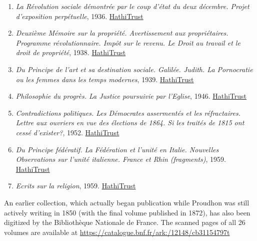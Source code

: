 \begin{enumerate}
    \item \textit{La Révolution sociale démontrée par le coup d'état du deux décembre. Projet d'exposition perpétuelle}, 1936. \href{https://hdl.handle.net/2027/uc1.b4149266}{HathiTrust}
    
    \item \textit{Deuxième Mémoire sur la propriété. Avertissement aux propriétaires. Programme révolutionnaire. Impôt sur le revenu. Le Droit au travail et le droit de propriété}, 1938. \href{https://hdl.handle.net/2027/uc1.b4149267}{HathiTrust}
    
    \item \textit{Du Principe de l'art et sa destination sociale. Galilée. Judith. La Pornocratie ou les femmes dans les temps modernes}, 1939. \href{https://hdl.handle.net/2027/uc1.b4149268}{HathiTrust}
    
    \item \textit{Philosophie du progrès. La Justice poursuivie par l'Eglise}, 1946. \href{https://hdl.handle.net/2027/uc1.b4149269}{HathiTrust}
    
    \item \textit{Contradictions politiques. Les Démocrates assermentés et les réfractaires. Lettre aux ouvriers en vue des élections de 1864. Si les traités de 1815 ont cessé d'exister?}, 1952. \href{https://hdl.handle.net/2027/uc1.b4149270}{HathiTrust}
    
    \item \textit{Du Principe fédératif. La Fédération et l'unité en Italie. Nouvelles Observations sur l'unité italienne. France et Rhin (fragments)}, 1959. \href{https://hdl.handle.net/2027/uc1.b4149271}{HathiTrust}
    
    \item \textit{Ecrits sur la religion}, 1959. \href{https://hdl.handle.net/2027/uc1.b4149272}{HathiTrust}
\end{enumerate}

An earlier collection, which actually began publication while Proudhon was still actively writing in 1850 (with the final volume published in 1872), has also been digitized by the Bibliothèque Nationale de France. The scanned pages of all 26 volumes are available at \href{https://catalogue.bnf.fr/ark:/12148/cb31154797t}{https://catalogue.bnf.fr/ark:/12148/cb31154797t}


